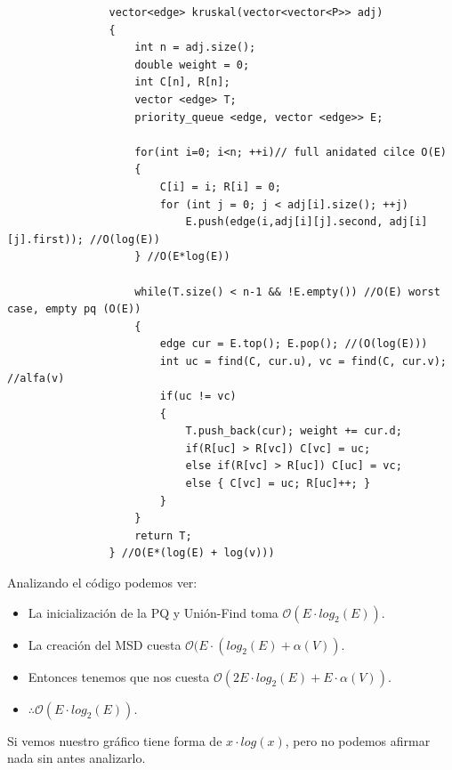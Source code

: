 \documentclass[letterpaper,11pt]{article}
\begin{document}
            \newpage

            \small{\begin{lstlisting}
                vector<edge> kruskal(vector<vector<P>> adj)
                {
                    int n = adj.size();
                    double weight = 0;
                    int C[n], R[n];
                    vector <edge> T;
                    priority_queue <edge, vector <edge>> E;
                    
                    for(int i=0; i<n; ++i)// full anidated cilce O(E)
                    {
                        C[i] = i; R[i] = 0;
                        for (int j = 0; j < adj[i].size(); ++j)      
                            E.push(edge(i,adj[i][j].second, adj[i][j].first)); //O(log(E))
                    } //O(E*log(E))

                    while(T.size() < n-1 && !E.empty()) //O(E) worst case, empty pq (O(E))
                    {
                        edge cur = E.top(); E.pop(); //(O(log(E)))
                        int uc = find(C, cur.u), vc = find(C, cur.v); //alfa(v)
                        if(uc != vc)
                        {
                            T.push_back(cur); weight += cur.d;
                            if(R[uc] > R[vc]) C[vc] = uc;
                            else if(R[vc] > R[uc]) C[uc] = vc;
                            else { C[vc] = uc; R[uc]++; }
                        }
                    }
                    return T;
                } //O(E*(log(E) + log(v)))
            \end{lstlisting}} \normalsize

            Analizando el código podemos ver:
            \begin{itemize}
                \item La inicialización de la PQ y Unión-Find toma $\mathcal{O}(E\cdot log_2(E))$.
                \item La creación del MSD cuesta $\mathcal{O}(E\cdot ( log_2(E) + \alpha(V))$.
                \item Entonces tenemos que nos cuesta $\mathcal{O}(2E\cdot log_2(E) + E\cdot \alpha(V))$.
                \item $\therefore \mathcal{O}(E\cdot log_2(E))$.
            \end{itemize}
            
            Si vemos nuestro gráfico tiene forma de $x\cdot log(x)$, pero no podemos afirmar nada sin antes analizarlo.
            
\end{document}

